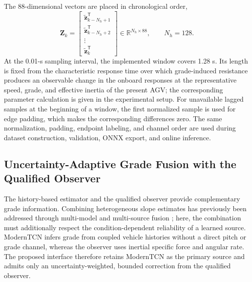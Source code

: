\documentclass{ieeeaccess}
\newcommand{\citep}[1]{\cite{#1}}
\begin{document}
The 88-dimensional vectors are placed in chronological order,
\begin{equation}
\mathbf Z_k=
\begin{bmatrix}
\widetilde{\mathbf z}_{k-N_h+1}^{\mathsf T}\\
\widetilde{\mathbf z}_{k-N_h+2}^{\mathsf T}\\
\vdots\\
\widetilde{\mathbf z}_{k}^{\mathsf T}
\end{bmatrix}
\in\mathbb R^{N_h\times88},\qquad N_h=128.
\label{eq:historical_input_128x88}
\end{equation}
At the 0.01-s sampling interval, the implemented window covers 1.28 s. Its length is fixed from the characteristic response time over which grade-induced resistance produces an observable change in the onboard responses at the representative speed, grade, and effective inertia of the present AGV; the corresponding parameter calculation is given in the experimental setup. For unavailable lagged samples at the beginning of a window, the first normalized sample is used for edge padding, which makes the corresponding differences zero. The same normalization, padding, endpoint labeling, and channel order are used during dataset construction, validation, ONNX export, and online inference.

\subsection{Uncertainty-Adaptive Grade Fusion with the Qualified Observer}
\label{sec:adaptive_slope_fusion}

The history-based estimator and the qualified observer provide complementary grade information. Combining heterogeneous slope estimates has previously been addressed through multi-model and multi-source fusion \citep{Feng2021MultiModelFusion}; here, the combination must additionally respect the condition-dependent reliability of a learned source. ModernTCN infers grade from coupled vehicle histories without a direct pitch or grade channel, whereas the observer uses inertial specific force and angular rate. The proposed interface therefore retains ModernTCN as the primary source and admits only an uncertainty-weighted, bounded correction from the qualified observer.
\end{document}
